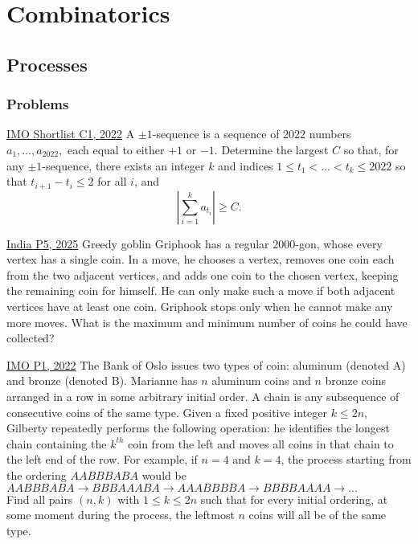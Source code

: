 \chapter{Combinatorics}
\section{Processes}
\subsection{Problems}
\begin{problem}{1}{\href{https://artofproblemsolving.com/community/q1h3107334p34892180}{IMO Shortlist C1, 2022}} 
	A $\pm 1$-sequence is a sequence of $2022$ numbers $a_1, \ldots, a_{2022},$ each equal to either $+1$ or $-1$. Determine the largest $C$ so that, for any $\pm 1$-sequence, there exists an integer $k$ and indices $1 \le t_1 < \ldots < t_k \le 2022$ so that $t_{i+1} - t_i \le 2$ for all $i$, and$$\left| \sum_{i = 1}^{k} a_{t_i} \right| \ge C.$$
\end{problem}

\begin{problem}{2}{\href{https://artofproblemsolving.com/community/q1h3483100p34496847}{India P5, 2025}}
	Greedy goblin Griphook has a regular $2000$-gon, whose every vertex has a single coin. In a move, he chooses a vertex, removes one coin each from the two adjacent vertices, and adds one coin to the chosen vertex, keeping the remaining coin for himself. He can only make such a move if both adjacent vertices have at least one coin. Griphook stops only when he cannot make any more moves. What is the maximum and minimum number of coins he could have collected?
\end{problem}

\begin{problem}{3}{\href{https://artofproblemsolving.com/community/q1h2883211p34203276}{IMO P1, 2022}}
	The Bank of Oslo issues two types of coin: aluminum (denoted A) and bronze (denoted B). Marianne has $n$ aluminum coins and $n$ bronze coins arranged in a row in some arbitrary initial order. A chain is any subsequence of consecutive coins of the same type. Given a fixed positive integer $k \leq 2n$, Gilberty repeatedly performs the following operation: he identifies the longest chain containing the $k^{th}$ coin from the left and moves all coins in that chain to the left end of the row. For example, if $n=4$ and $k=4$, the process starting from the ordering $AABBBABA$ would be $AABBBABA \to BBBAAABA \to AAABBBBA \to BBBBAAAA \to ...$\\
	Find all pairs $(n,k)$ with $1 \leq k \leq 2n$ such that for every initial ordering, at some moment during the process, the leftmost $n$ coins will all be of the same type.
\end{problem}

